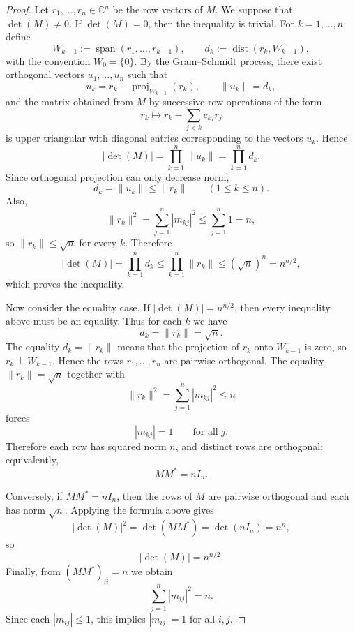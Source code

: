 \documentclass[11pt, a4paper]{ctexrep}
\begin{document}
\begin{proof}
    Let $r_1,\dots,r_n\in \mathbb{C}^n$ be the row vectors of $M$. We suppose that $\det(M)\neq 0$. If $\det(M)=0$, then the inequality is trivial.
    For $k=1,\dots,n$, define
    \[
        W_{k-1}:=\operatorname{span}(r_1,\dots,r_{k-1}),
        \qquad
        d_k:=\operatorname{dist}(r_k,W_{k-1}),
    \]
    with the convention $W_0=\{0\}$.
    By the Gram--Schmidt process, there exist orthogonal vectors
    $u_1,\dots,u_n$ such that
    \[
        u_k=r_k-\operatorname{proj}_{W_{k-1}}(r_k),
        \qquad
        \|u_k\|=d_k,
    \]
    and the matrix obtained from $M$ by successive row operations of the form
    \[
        r_k \longmapsto r_k-\sum_{j<k} c_{kj}r_j
    \]
    is upper triangular with diagonal entries corresponding to the vectors $u_k$.
    Hence
    \[
        |\det(M)|=\prod_{k=1}^n \|u_k\|
        =\prod_{k=1}^n d_k.
    \]
    Since orthogonal projection can only decrease norm,
    \[
        d_k=\|u_k\|\leqslant \|r_k\|
        \qquad (1\leqslant k\leqslant n).
    \]
    Also,
    \[
        \|r_k\|^2=\sum_{j=1}^n |m_{kj}|^2 \leqslant \sum_{j=1}^n 1 = n,
    \]
    so $\|r_k\|\leqslant \sqrt{n}$ for every $k$.
    Therefore
    \[
        |\det(M)|
        =\prod_{k=1}^n d_k
        \leqslant \prod_{k=1}^n \|r_k\|
        \leqslant (\sqrt{n})^n
        = n^{n/2},
    \]
    which proves the inequality.

    Now consider the equality case.
    If $|\det(M)|=n^{n/2}$, then every inequality above must be an equality.
    Thus for each $k$ we have
    \[
        d_k=\|r_k\|=\sqrt{n}.
    \]
    The equality $d_k=\|r_k\|$ means that the projection of $r_k$ onto $W_{k-1}$ is zero,
    so $r_k\perp W_{k-1}$.
    Hence the rows $r_1,\dots,r_n$ are pairwise orthogonal.
    The equality $\|r_k\|=\sqrt{n}$ together with
    \[
        \|r_k\|^2=\sum_{j=1}^n |m_{kj}|^2 \leqslant n
    \]
    forces
    \[
        |m_{kj}|=1 \qquad \text{for all } j.
    \]
    Therefore each row has squared norm $n$, and distinct rows are orthogonal; equivalently,
    \[
        MM^{*}=nI_n.
    \]

    Conversely, if $MM^{*}=nI_n$, then the rows of $M$ are pairwise orthogonal and each has norm $\sqrt{n}$.
    Applying the formula above gives
    \[
        |\det(M)|^2=\det(MM^{*})=\det(nI_n)=n^n,
    \]
    so
    \[
        |\det(M)|=n^{n/2}.
    \]
    Finally, from $(MM^{*})_{ii}=n$ we obtain
    \[
        \sum_{j=1}^n |m_{ij}|^2=n.
    \]
    Since each $|m_{ij}|\leqslant 1$, this implies $|m_{ij}|=1$ for all $i,j$.
\end{proof}
\end{document}
